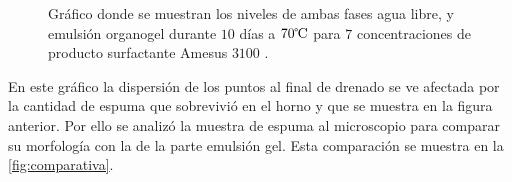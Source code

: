 \begin{figure}[H]\centering 
    \caption[Drenado de las fases]{Gráfico donde se muestran los niveles de ambas fases agua libre, y emulsión organogel durante $10$ días a $70 \celsius $ para $7$ concentraciones de producto surfactante Amesus $3100$ . }
    \label{fig:drene2}
\end{figure}

En este gráfico la dispersión de los puntos al final de drenado se ve afectada por la cantidad de espuma que sobrevivió en el horno y que se muestra en la figura anterior. Por ello se analizó la muestra de espuma al microscopio para comparar su morfología con la de la parte emulsión gel. Esta comparación se muestra en la \autoref{fig:comparativa}.

